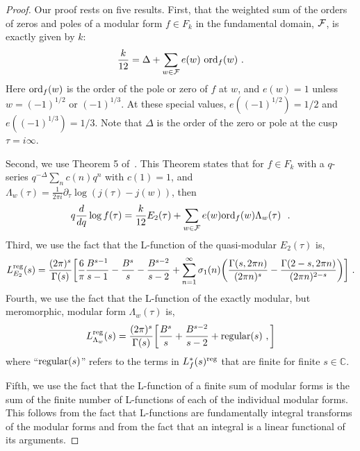 \documentclass[11pt,a4paper]{article}
\newcommand{\G}{\Gamma}
\newcommand{\La}{\Lambda}
\def\C{\mathbb{C}}
\newcommand{\reg}{{\rm reg}}
\begin{document}
\begin{proof}
Our proof rests on five results. First, that the weighted sum of the orders of zeros and poles of a modular form $f \in F_k$ in the fundamental domain, $\cal{F}$, is exactly given by $k$:
\begin{align}
\frac{k}{12} = \Delta + \sum_{w \in \cal{F}} e(w) ~ {\rm ord}_f(w)~. \label{eqThmTrex2}
\end{align}
Here ${\rm ord}_f(w)$ is the order of the pole or zero of $f$ at $w$, and $e(w) = 1$ unless $w = (-1)^{1/2}$ or $(-1)^{1/3}$. At these special values, $e((-1)^{1/2}) = 1/2$ and $e((-1)^{1/3}) = 1/3$. Note that $\Delta$ is the order of the zero or pole at the cusp $\tau = i \infty$. 

Second, we use Theorem 5 of~\cite{22-DivisorsMF2}. This Theorem states that for $f \in F_k$ with a $q$-series $q^{-\Delta} \sum_{n} c(n) q^n$ with $c(1) = 1$, and $\La_w(\tau) = \tfrac{1}{2 \pi i } \partial_{\tau} \log (j(\tau)-j(w))$, then
\begin{align}
q \frac{d}{dq} \log f(\tau) = \frac{k}{12} E_2(\tau) + 
\sum_{w \in \cal{F}}e(w)  {\rm ord}_f(w) \La_w(\tau)~~.
\label{eqThmTrex3}
\end{align}
Third, we use the fact that the L-function of the quasi-modular $E_2(\tau)$ is,
\begin{align}
L_{E_2}^\reg(s) = \frac{(2 \pi)^s}{\G(s)} \bigg[ \frac{6}{\pi} \frac{B^{s-1}}{s-1}-\frac{B^s}{s} - \frac{B^{s-2}}{s-2} + \sum_{n = 1}^{\infty} \sigma_1(n) \bigg( \frac{\G(s,2\pi n)}{(2 \pi n)^s} - \frac{\G(2-s,2\pi n)}{(2 \pi n)^{2-s}}\bigg) \bigg] ~. \label{eqThmTrex4}
\end{align}
Fourth, we use the fact that the L-function of the exactly modular, but meromorphic, modular form $\La_w(\tau)$ is,
\begin{align}
L_{\La_w}^\reg(s) = \frac{(2 \pi)^s}{\G(s)} \bigg[ \frac{B^s}{s} + \frac{B^{s-2}}{s-2} + {\rm regular}(s)~,\bigg] \label{eqThmTrex5}
\end{align}
where ``${\rm regular}(s)$'' refers to the terms in $L_f^*(s)^\reg$ that are finite for finite $s \in \C$.

Fifth, we use the fact that the L-function of a finite sum of modular forms is the sum of the finite number of L-functions of each of the individual modular forms. This follows from the fact that L-functions are fundamentally integral transforms of the modular forms and from the fact that an integral is a linear functional of its arguments.


\end{proof}
\end{document}
